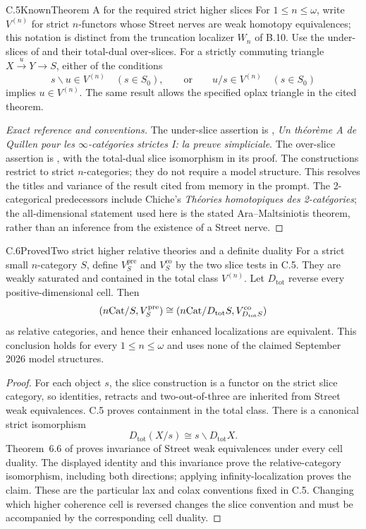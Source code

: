 \begin{claim}{C.5}{Known}{Theorem A for the required strict higher slices}
For $1\leq n\leq\omega$, write $V^{(n)}$ for strict $n$-functors whose
Street nerves are weak homotopy equivalences; this notation is distinct
from the truncation localizer $W_n$ of B.10. Use the under-slices of
\citet[\S4]{BCAraMaltsiniotis2018} and their total-dual over-slices.
For a strictly commuting triangle $X\xrightarrow{u}Y\to S$, either
of the conditions
\[
 s\backslash u\in V^{(n)}\quad(s\in S_0),
 \qquad\text{or}\qquad
 u/s\in V^{(n)}\quad(s\in S_0)
\]
implies $u\in V^{(n)}$. The same result allows the specified oplax
triangle in the cited theorem.
\end{claim}
\begin{proof}[Exact reference and conventions]
The under-slice assertion is
\citet[Theorem 5.2 and Remark 5.3]{BCAraMaltsiniotis2018},
\emph{Un th\'eor\`eme A de Quillen pour les $\infty$-cat\'egories
strictes I: la preuve simpliciale}. The over-slice assertion is
\citet[Corollary 6.8]{BCAraMaltsiniotis2022}, with the total-dual slice
isomorphism in its proof. The constructions restrict to strict $n$-categories;
they do not require a model structure. This resolves the titles and
variance of the result cited from memory in the prompt. The 2-categorical
predecessors include Chiche's \emph{Th\'eories homotopiques des 2-cat\'egories};
the all-dimensional statement used here is the stated Ara--Maltsiniotis
theorem, rather than an inference from the existence of a Street nerve.
\end{proof}

\begin{claim}{C.6}{Proved}{Two strict higher relative theories and a definite duality}
For a strict small $n$-category $S$, define $V^{\mathrm{pre}}_S$ and
$V^{\mathrm{co}}_S$ by the two slice tests in C.5. They are weakly
saturated and contained in the total class $V^{(n)}$. Let
$D_{\mathrm{tot}}$ reverse every positive-dimensional cell. Then
\[
 (n\mathrm{Cat}/S,V^{\mathrm{pre}}_S)
 \cong(n\mathrm{Cat}/D_{\mathrm{tot}}S,V^{\mathrm{co}}_{D_{\mathrm{tot}}S})
\]
as relative categories, and hence their enhanced localizations are
equivalent. This conclusion holds for every $1\leq n\leq\omega$ and
uses none of the claimed September 2026 model structures.
\end{claim}
\begin{proof}
For each object $s$, the slice construction is a functor on the strict
slice category, so identities, retracts and two-out-of-three are inherited
from Street weak equivalences. C.5 proves containment in the total class.
There is a canonical strict isomorphism
\[
 D_{\mathrm{tot}}(X/s)\cong s\backslash D_{\mathrm{tot}}X.
\]
Theorem~6.6 of \citet{BCAraMaltsiniotis2022} proves invariance of Street
weak equivalences under every cell duality. The displayed identity and
this invariance prove the relative-category isomorphism, including both
directions; applying infinity-localization proves the claim.
These are the particular lax and colax conventions fixed in C.5. Changing
which higher coherence cell is reversed changes the slice convention and
must be accompanied by the corresponding cell duality.
\end{proof}

